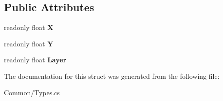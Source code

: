 \subsection*{Public Attributes}
\begin{DoxyCompactItemize}
\item 
\mbox{\label{struct_stompy_blondie_1_1_common_1_1_types_1_1_pos_a50dc3dd8daa99fb4d2bcc052bcf2e219}} 
readonly float {\bfseries X}
\item 
\mbox{\label{struct_stompy_blondie_1_1_common_1_1_types_1_1_pos_a07913bf1a36289c0fe28c280c10390c5}} 
readonly float {\bfseries Y}
\item 
\mbox{\label{struct_stompy_blondie_1_1_common_1_1_types_1_1_pos_a9e3f36f4ed1d57b2c6b8a7520f82b283}} 
readonly float {\bfseries Layer}
\end{DoxyCompactItemize}


The documentation for this struct was generated from the following file\+:\begin{DoxyCompactItemize}
\item 
Common/Types.\+cs\end{DoxyCompactItemize}
